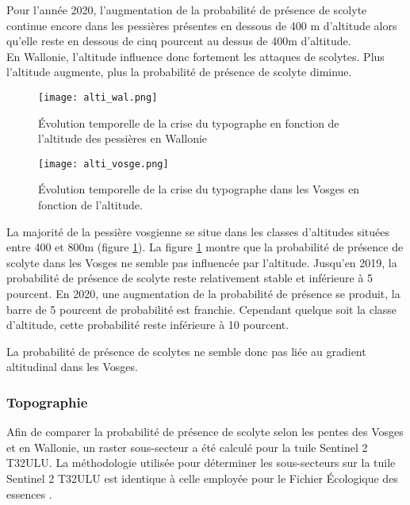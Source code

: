 Pour l'année 2020, l'augmentation de la probabilité de présence de scolyte continue encore dans les pessières présentes en dessous de 400 m d'altitude alors qu'elle reste en dessous de cinq pourcent au dessus de 400m d'altitude.\\

En Wallonie, l'altitude influence donc fortement les attaques de scolytes. Plus l'altitude augmente, plus la probabilité de présence de scolyte diminue. \\

\begin{figure}[htbp]
	\begin{minipage}[b]{1 \linewidth}
		\centering
		\texttt{[image: alti\_wal.png]}
		\caption{Évolution temporelle de la crise du typographe en fonction de l'altitude des pessières en Wallonie }
		\label{fig: alti_rw}
		
	\end{minipage}\hfill
	\vspace{0.75cm}
	\begin{minipage}[b]{1 \linewidth}
		\centering
		\texttt{[image: alti\_vosge.png]}
		\caption{Évolution temporelle de la crise du typographe dans les Vosges en fonction de l'altitude.}
		\label{fig: alti_vosges}
	\end{minipage}
\end{figure}




La majorité de la pessière vosgienne se situe dans les classes d'altitudes situées entre 400 et 800m (figure \ref{fig: alti_vosges}).
La figure \ref{fig: alti_vosges} montre que la probabilité de présence de scolyte dans les Vosges ne semble pas influencée par l'altitude. Jusqu'en 2019, la probabilité de présence de scolyte reste relativement stable et inférieure à 5 pourcent. En 2020, une augmentation de la probabilité de présence se produit, la barre de 5 pourcent de probabilité est franchie. Cependant quelque soit la classe d'altitude, cette probabilité reste inférieure à 10 pourcent.


La probabilité de présence de scolytes ne semble donc pas liée au gradient altitudinal dans les Vosges.


\subsubsection{Topographie}
Afin de comparer la probabilité de présence de scolyte selon les pentes des Vosges et en Wallonie, un raster sous-secteur a été calculé pour la tuile Sentinel 2 T32ULU. La méthodologie utilisée pour déterminer les sous-secteurs sur la tuile Sentinel 2 T32ULU est identique à celle employée pour le Fichier Écologique des essences \citep{wampach_cartographie_2017}.

